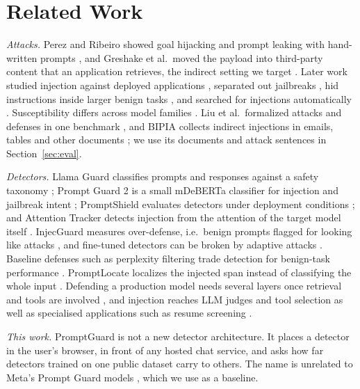 \documentclass[conference]{IEEEtran}
\begin{document}
\section{Related Work}\label{sec:related}
\emph{Attacks.} Perez and Ribeiro showed goal hijacking and prompt leaking with hand-written prompts
\cite{perez2022ignore}, and Greshake et al.\ moved the payload into third-party content that an
application retrieves, the indirect setting we target \cite{greshake2023not}. Later work studied
injection against deployed applications \cite{liu2023promptinjection}, separated out jailbreaks
\cite{liu2023jailbreaking}, hid instructions inside larger benign tasks \cite{jiang2023packer}, and
searched for injections automatically \cite{zhang2024goal,pasquini2024neural}. Susceptibility differs
across model families \cite{benjamin2024systematically}. Liu et al.\ formalized attacks and defenses in one
benchmark \cite{liu2024formalizing}, and BIPIA collects indirect injections in emails, tables and other
documents \cite{yi2025bipia}; we use its documents and attack sentences in Section~\ref{sec:eval}.

\emph{Detectors.} Llama Guard classifies prompts and responses against a safety taxonomy
\cite{inan2023llamaguard}; Prompt Guard 2 is a small mDeBERTa classifier for injection and jailbreak
intent \cite{meta2025promptguard2}; PromptShield evaluates detectors under deployment conditions
\cite{jacob2025promptshield}; and Attention Tracker detects injection from the attention of the target
model itself \cite{hung2024attention}. InjecGuard measures over-defense, i.e.\ benign prompts flagged for
looking like attacks \cite{li2024injecguard}, and fine-tuned detectors can be broken by adaptive attacks
\cite{pandya2025attention}. Baseline defenses such as perplexity filtering trade detection for
benign-task performance \cite{jain2023baseline}. PromptLocate localizes the injected span instead of
classifying the whole input \cite{jia2026promptlocate}. Defending a production model needs several layers
once retrieval and tools are involved \cite{shi2025gemini}, and injection reaches LLM judges and tool
selection \cite{shi2024judge,shi2025toolselection} as well as specialised applications such as resume
screening \cite{mu2025resume}.

\emph{This work.} PromptGuard is not a new detector architecture. It places a detector in the user's
browser, in front of any hosted chat service, and asks how far detectors trained on one public dataset
carry to others. The name is unrelated to Meta's Prompt Guard models \cite{meta2025promptguard2}, which
we use as a baseline.
\end{document}
